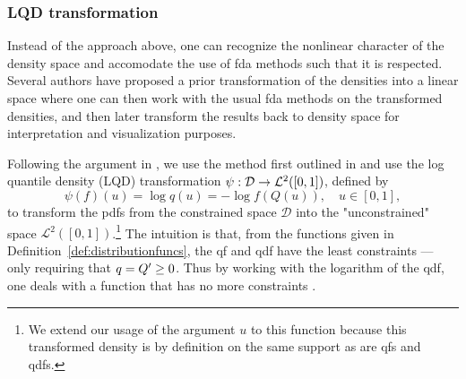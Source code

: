 \subsubsection{LQD transformation}
\label{sec:transformation_interpretation}
Instead of the approach above, one can recognize the nonlinear character of the density
space and accomodate the use of fda methods such that it is respected. Several authors
have proposed a prior transformation of the densities into a linear space
\parencites[e.g.][]{Hron2016}[][]{PetersenMüller2016} where one can then work with the
usual fda methods on the transformed densities, and then later transform the results
back to density space for interpretation and visualization purposes.

Following the argument in \textcite{KokoszkaEtAl2019}, we use the method first outlined
in \textcite{PetersenMüller2016} and use the log quantile density (LQD) transformation
$\psi : \nobreak \mathcal{D} \to \mathcal{L}^2([0,1])$, defined by
\begin{equation}
    \label{eq:lqd_definition}
    \psi (f)(u) = \log q(u) = -\log f(Q(u)), \quad u \in [0,1],
\end{equation}
to transform the pdfs from the constrained space $\mathcal{D}$ into the "unconstrained"
space $\mathcal{L}^2([0,1])$.\footnote{We extend our usage of the argument $u$ to this
function because this transformed density is by definition on the same support as are
qfs and qdfs.} The intuition is that, from the functions given in
Definition~\ref{def:distributionfuncs}, the qf and qdf have the least constraints ---
only requiring that $q = \nobreak Q' \geq \nobreak 0$. Thus by working with the logarithm
of the qdf, one deals with a function that has no more constraints \parencite[cf.][]{KokoszkaEtAl2019}.

